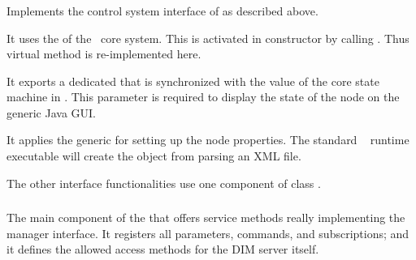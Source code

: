 \subsubsection{}
Implements the control system interface of
 as described above. 

\begin{compactenum}

\item It uses the  of the \dabc~core system.
This is activated in  constructor by calling
. Thus virtual method 
is  re-implemented here.

\item It exports a dedicated  that is
synchronized with the value of the core state machine in . 
This parameter is required to display the state of the node on the generic
Java GUI.

\item It applies the generic   for setting up
the node properties. The standard \dabc~ runtime executable will create the  object from parsing an XML file. 

\item The other interface functionalities use one
component of class .

\end{compactenum}




\subsubsection{}
The main component of the  that
offers service methods really implementing the manager interface.
It registers all parameters, commands, and subscriptions; 
and it defines the allowed access methods for the DIM server itself.
 
